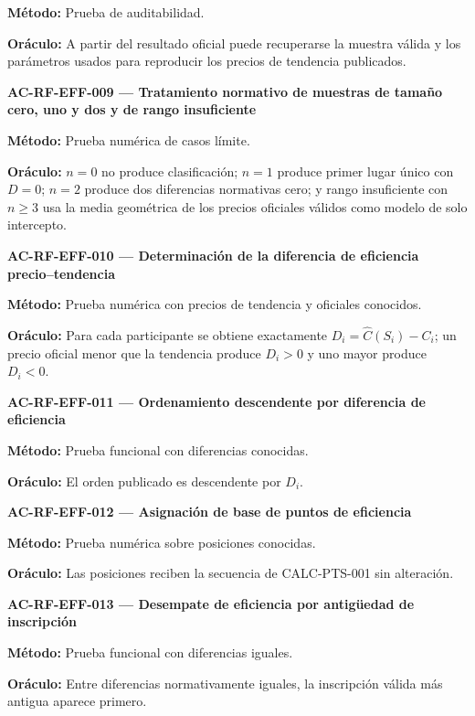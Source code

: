 \documentclass[10pt,letterpaper]{article}
\begin{document}
\textbf{Método:} Prueba de auditabilidad.\par
\textbf{Oráculo:} A partir del resultado oficial puede recuperarse la muestra válida y los parámetros usados para reproducir los precios de tendencia publicados.\par\vspace{0.45em}
\noindent\textbf{AC-RF-EFF-009 --- Tratamiento normativo de muestras de tamaño cero, uno y dos y de rango insuficiente}\par
\textbf{Método:} Prueba numérica de casos límite.\par
\textbf{Oráculo:} $n=0$ no produce clasificación; $n=1$ produce primer lugar único con $D=0$; $n=2$ produce dos diferencias normativas cero; y rango insuficiente con $n\ge3$ usa la media geométrica de los precios oficiales válidos como modelo de solo intercepto.\par\vspace{0.45em}
\noindent\textbf{AC-RF-EFF-010 --- Determinación de la diferencia de eficiencia precio--tendencia}\par
\textbf{Método:} Prueba numérica con precios de tendencia y oficiales conocidos.\par
\textbf{Oráculo:} Para cada participante se obtiene exactamente $D_i=\widehat C(S_i)-C_i$; un precio oficial menor que la tendencia produce $D_i>0$ y uno mayor produce $D_i<0$.\par\vspace{0.45em}
\noindent\textbf{AC-RF-EFF-011 --- Ordenamiento descendente por diferencia de eficiencia}\par
\textbf{Método:} Prueba funcional con diferencias conocidas.\par
\textbf{Oráculo:} El orden publicado es descendente por $D_i$.\par\vspace{0.45em}
\noindent\textbf{AC-RF-EFF-012 --- Asignación de base de puntos de eficiencia}\par
\textbf{Método:} Prueba numérica sobre posiciones conocidas.\par
\textbf{Oráculo:} Las posiciones reciben la secuencia de CALC-PTS-001 sin alteración.\par\vspace{0.45em}
\noindent\textbf{AC-RF-EFF-013 --- Desempate de eficiencia por antigüedad de inscripción}\par
\textbf{Método:} Prueba funcional con diferencias iguales.\par
\textbf{Oráculo:} Entre diferencias normativamente iguales, la inscripción válida más antigua aparece primero.\par\vspace{0.45em}
\end{document}
